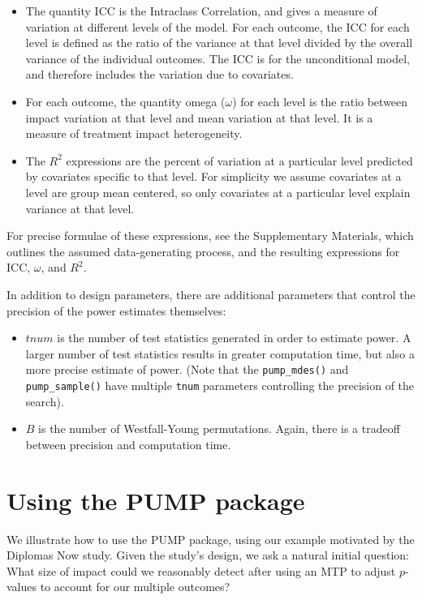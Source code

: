 \documentclass[
]{article}
\providecommand{\tightlist}{%
  \setlength{\itemsep}{0pt}\setlength{\parskip}{0pt}}
\begin{document}
\begin{itemize}
\item
  The quantity \(\text{ICC}\) is the Intraclass Correlation, and gives a
  measure of variation at different levels of the model. For each
  outcome, the ICC for each level is defined as the ratio of the
  variance at that level divided by the overall variance of the
  individual outcomes. The ICC is for the unconditional model, and
  therefore includes the variation due to covariates.
\item
  For each outcome, the quantity omega (\(\omega\)) for each level is
  the ratio between impact variation at that level and mean variation at
  that level. It is a measure of treatment impact heterogeneity.
\item
  The \(R^2\) expressions are the percent of variation at a particular
  level predicted by covariates specific to that level. For simplicity
  we assume covariates at a level are group mean centered, so only
  covariates at a particular level explain variance at that level.
\end{itemize}

For precise formulae of these expressions, see the Supplementary
Materials, which outlines the assumed data-generating process, and the
resulting expressions for \(\text{ICC}\), \(\omega\), and \(R^2\).

In addition to design parameters, there are additional parameters that
control the precision of the power estimates themselves:

\begin{itemize}
\tightlist
\item
  \(tnum\) is the number of test statistics generated in order to
  estimate power. A larger number of test statistics results in greater
  computation time, but also a more precise estimate of power. (Note
  that the \texttt{pump\_mdes()} and \texttt{pump\_sample()} have
  multiple \texttt{tnum} parameters controlling the precision of the
  search).
\item
  \(B\) is the number of Westfall-Young permutations. Again, there is a
  tradeoff between precision and computation time.
\end{itemize}

\section{Using the PUMP package}
\label{sec:vignette}

We illustrate how to use the PUMP package, using our example motivated
by the Diplomas Now study. Given the study's design, we ask a natural
initial question: What size of impact could we reasonably detect after
using an MTP to adjust \(p\)-values to account for our multiple
outcomes?
\end{document}
